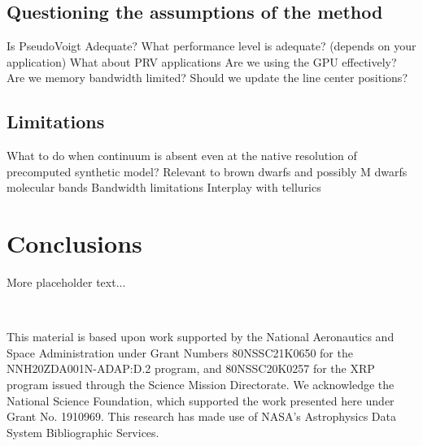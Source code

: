 \documentclass[modern]{aastex631}
\begin{document}
\subsection{Questioning the assumptions of the method}

\begin{outline}
    \1 Is PseudoVoigt Adequate?
    \1 What performance level is adequate? (depends on your application)
    \1 What about PRV applications
    \1 Are we using the GPU effectively? Are we memory bandwidth limited?
    \1 Should we update the line center positions?
\end{outline}

\subsection{Limitations}
\begin{outline}
    \1 What to do when continuum is absent even at the native resolution of precomputed synthetic model?
    \1 Relevant to brown dwarfs and possibly M dwarfs molecular bands
    \1 Bandwidth limitations
    \1 Interplay with tellurics
\end{outline}



\section{Conclusions}
More placeholder text...


\

\begin{acknowledgements}
    This material is based upon work supported by the National Aeronautics and Space Administration under Grant Numbers 80NSSC21K0650 for the NNH20ZDA001N-ADAP:D.2 program, and 80NSSC20K0257 for the XRP program issued through the Science Mission Directorate.  We acknowledge the National Science Foundation, which supported the work presented here under Grant No. 1910969.  This research has made use of NASA's Astrophysics Data System Bibliographic Services.
\end{acknowledgements}

\clearpage



\end{document}
